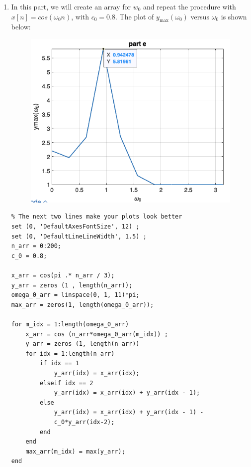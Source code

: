 \documentclass[12pt]{article}
\begin{document}
\begin{enumerate}[label=\textbf{\alph*)}, leftmargin=2.6em]
\begin{verbatim}
x_arr = cos(pi .* n_arr / 3);

y_arr = zeros (1 , length(n_arr)) ;

for idx = 1: length ( n_arr )
    if idx == 1
        y_arr(idx) = x_arr(idx);
    elseif idx == 2
        y_arr(idx) = x_arr(idx) + y_arr(idx - 1);
    else
        y_arr(idx) = x_arr(idx) + y_arr(idx - 1) - c_0*y_arr(idx-2);
    end
end

% You can use stem here , but it will be difficult to understand .
plot (n_arr , y_arr );
title('difference equation c0=', c_0, 'FontSize', 16)
xlabel('n', 'FontSize', 16);
ylabel('y[n]', 'FontSize', 16);

%% The next two lines make your plot look better
axis tight ;
grid on;
\end{verbatim}
We see here that the amplitude of $y[n]$ increases with an increased $c_0$. Furthermore, we observe that when $c_0=1.1$, $y[n]$ becomes unbounded as $n\to\infty$, with its amplitude also approaching $\infty$.

\item In this part, we will create an array for $w_0$ and repeat the procedure with $x[n]=cos(\omega_0n)$, with $c_0=0.8$. The plot of $y_{\text{max}}(\omega_0)$ versus $\omega_0$ is shown below:
\begin{figure}[H]
    \centering
    \includegraphics[width=0.5\linewidth]{plot9.png}
\end{figure}
\begin{verbatim}
% The next two lines make your plots look better
set (0, 'DefaultAxesFontSize', 12) ;
set (0, 'DefaultLineLineWidth', 1.5) ;
n_arr = 0:200;
c_0 = 0.8;

x_arr = cos(pi .* n_arr / 3);
y_arr = zeros (1 , length(n_arr));
omega_0_arr = linspace(0, 1, 11)*pi;
max_arr = zeros(1, length(omega_0_arr));

for m_idx = 1:length(omega_0_arr)
    x_arr = cos (n_arr*omega_0_arr(m_idx)) ;
    y_arr = zeros (1, length(n_arr)) 
    for idx = 1:length(n_arr)
        if idx == 1
            y_arr(idx) = x_arr(idx);
        elseif idx == 2
            y_arr(idx) = x_arr(idx) + y_arr(idx - 1);
        else
            y_arr(idx) = x_arr(idx) + y_arr(idx - 1) -
            c_0*y_arr(idx-2);
        end
    end
    max_arr(m_idx) = max(y_arr);
end


\end{verbatim}
\end{enumerate}
\end{document}
